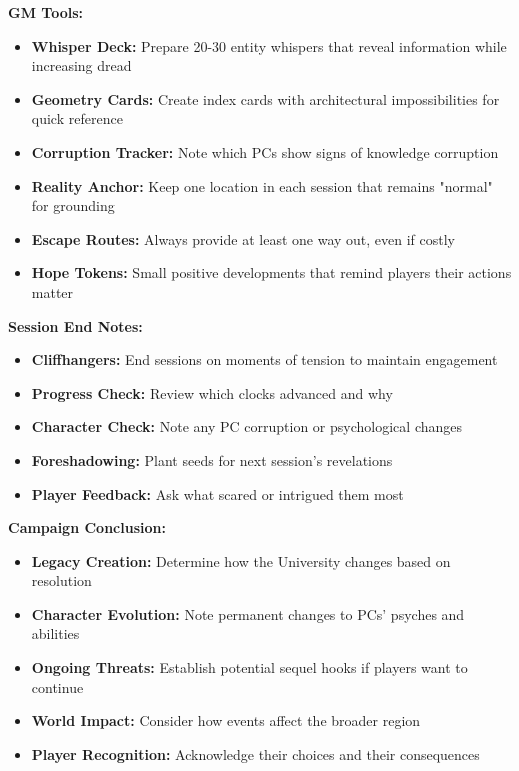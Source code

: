 \documentclass[11pt]{article}
\begin{document}
\textbf{GM Tools:}
\begin{itemize}
    \item \textbf{Whisper Deck:} Prepare 20-30 entity whispers that reveal information while increasing dread
    \item \textbf{Geometry Cards:} Create index cards with architectural impossibilities for quick reference
    \item \textbf{Corruption Tracker:} Note which PCs show signs of knowledge corruption
    \item \textbf{Reality Anchor:} Keep one location in each session that remains "normal" for grounding
    \item \textbf{Escape Routes:} Always provide at least one way out, even if costly
    \item \textbf{Hope Tokens:} Small positive developments that remind players their actions matter
\end{itemize}

\textbf{Session End Notes:}
\begin{itemize}
    \item \textbf{Cliffhangers:} End sessions on moments of tension to maintain engagement
    \item \textbf{Progress Check:} Review which clocks advanced and why
    \item \textbf{Character Check:} Note any PC corruption or psychological changes
    \item \textbf{Foreshadowing:} Plant seeds for next session's revelations
    \item \textbf{Player Feedback:} Ask what scared or intrigued them most
\end{itemize}

\textbf{Campaign Conclusion:}
\begin{itemize}
    \item \textbf{Legacy Creation:} Determine how the University changes based on resolution
    \item \textbf{Character Evolution:} Note permanent changes to PCs' psyches and abilities
    \item \textbf{Ongoing Threats:} Establish potential sequel hooks if players want to continue
    \item \textbf{World Impact:} Consider how events affect the broader region
    \item \textbf{Player Recognition:} Acknowledge their choices and their consequences
\end{itemize}
\end{document}

